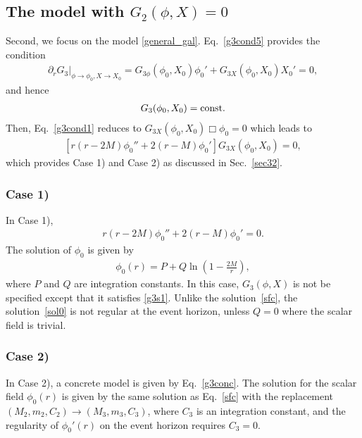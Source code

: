 \documentclass[prd,amsmath,amssymb,floatfix,superscriptaddress,notitlepage,nofootinbib,preprintnumbers]{revtex4-1}
\begin{document}
\subsection{The model with $G_2(\phi,X)=0$}
\label{sec42}

Second, we focus on the model \eqref{general_gal}.
Eq.~\eqref{g3cond5} provides the condition
\begin{align}
\label{g3s1}
\partial_r G_{3} 
\Big|_{\phi\to \phi_0,X\to X_0}
=G_{3\phi} (\phi_0,X_0)\phi_0'
+G_{3X}(\phi_0,X_0)X_0'
=0,
\end{align}
and hence 
\begin{align}
G_3(\phi_0,X_0)={\rm const.}
\end{align}
Then, 
Eq.~\eqref{g3cond1} reduces to 
$G_{3X} (\phi_0,X_0)\Box\phi_0 =0$
which leads to  
\begin{align} 
\left[
r(r-2M)\phi_0''
+2(r-M)\phi_0'
\right]
G_{3X}(\phi_0,X_0)=0,
\end{align}
which provides Case 1) and Case 2) as discussed in Sec.~\ref{sec32}.

\subsubsection{Case 1)}
\label{sec421}

In Case 1),
\begin{align}
r(r-2M)\phi_0''
+2(r-M)\phi_0'
=0.
\end{align}
The solution of $\phi_0$ is given by 
\begin{align}
\label{sol0}
\phi_0(r)=P+Q\ln \left(1-\frac{2M}{r}\right),
\end{align}
where $P$ and $Q$ are integration constants.
In this case, $G_3(\phi,X)$ is not be specified
except that it satisfies \eqref{g3s1}.
Unlike the solution~\eqref{sfc}, the solution~\eqref{sol0} is not regular at the event horizon,
unless $Q=0$ where the scalar field is trivial.


\subsubsection{Case 2)}
\label{sec422}

In Case 2),
a concrete model is given by Eq.~\eqref{g3conc}.
The solution for the scalar field $\phi_0(r)$
is given by the same solution as Eq.~\eqref{sfc}
with the replacement $(M_2,m_2,C_2)\to(M_3,m_3,C_3)$, 
where $C_3$ is an integration constant, and the regularity of $\phi_0'(r)$ on the event horizon 
requires $C_3=0$.
\end{document}
